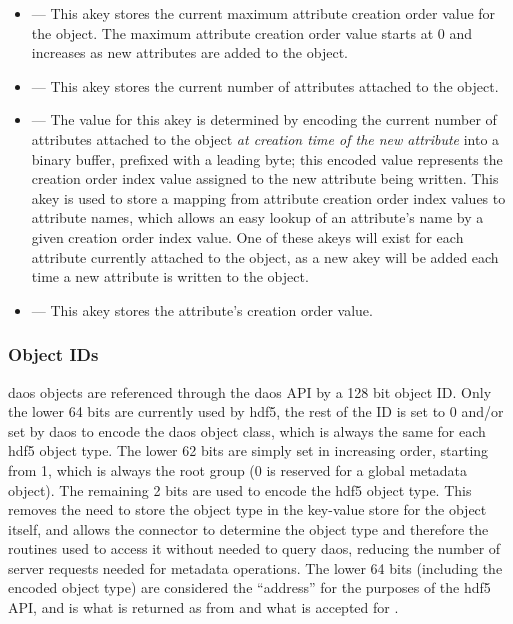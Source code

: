 \documentclass[../design_doc.tex]{subfiles}
\begin{document}
\begin{itemize}
    \item {} --- This \gls{akey} stores the current maximum attribute creation order value for the object. The maximum attribute creation order value starts at 0 and increases as new attributes are added to the object.
    \item {} --- This \gls{akey} stores the current number of attributes attached to the object.
    \item {} --- The value for this \gls{akey} is determined by encoding the current number of attributes attached to the object \textit{at creation time of the new attribute} into a binary buffer, prefixed with a leading  byte; this encoded value represents the creation order index value assigned to the new attribute being written. This \gls{akey} is used to store a mapping from attribute creation order index values to attribute names, which allows an easy lookup of an attribute's name by a given creation order index value. One of these \glspl{akey} will exist for each attribute currently attached to the object, as a new \gls{akey} will be added each time a new attribute is written to the object.
    \item {} --- This \gls{akey} stores the attribute's creation order value.
\end{itemize}


\newpage

\subsubsection{Object IDs}


\acrshort{daos} objects are referenced through the \acrshort{daos} API by a 128 bit object ID. Only the lower 64 bits are currently used by \acrshort{hdf5}, the rest of the ID is set to 0 and/or set by \acrshort{daos} to encode the \acrshort{daos} object class, which is always the same for each \acrshort{hdf5} object type. The lower 62 bits are simply set in increasing order, starting from 1, which is always the root group (0 is reserved for a global metadata object). The remaining 2 bits are used to encode the \acrshort{hdf5} object type. This
removes the need to store the object type in the key-value store for the object itself, and allows the \gls{connector} to determine the object type and therefore the routines used to access it without needed to query \acrshort{daos}, reducing the number of server requests needed for metadata operations. The lower 64 bits (including the encoded object type) are considered the “address” for the purposes of the \acrshort{hdf5} API, and is what is returned as  from  and what is accepted for .
\end{document}
